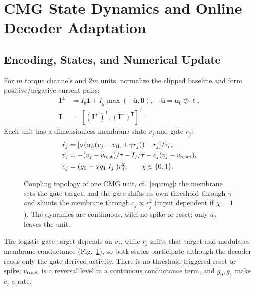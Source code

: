 \documentclass[letterpaper, 10 pt, conference]{ieeeconf}
\newcommand{\T}{^{\mathsf T}}
\begin{document}
\section{CMG State Dynamics and Online Decoder Adaptation}
\label{sec:architecture}
\label{sec:analysis}
\subsection{Encoding, States, and Numerical Update}

For $m$ torque channels and $2m$ units, normalize the clipped baseline and
form positive/negative current pairs:
\begin{equation}
 \begin{aligned}
 \bm I^{\pm}&=I_b\bm1+I_g\max(\pm\bar{\bm u},\bm0),\quad
 \bar{\bm u}=\bm u_0\oslash\bm\ell,\\
 \bm I&=[(\bm I^+)\T,(\bm I^-)\T]\T.
 \end{aligned}
 \label{eq:encoding}
\end{equation}
Each unit has a dimensionless membrane state $v_j$ and gate $r_j$:
\begin{align}
 \dot r_j&=[\sigma(\alpha_h(v_j-v_{\rm th}+\gamma r_j))-r_j]/\tau_r,\\
 \dot v_j&=-(v_j-v_{\rm rest})/\tau+I_j/\tau-c_j(v_j-v_{\rm reset}),\\
 c_j&=(g_0+\chi g_1|I_j|)r_j^2,\qquad \chi\in\{0,1\}.
 \label{eq:cmg}
\end{align}
\begin{figure}[t]
\centering
\resizebox{0.86\columnwidth}{!}{}
\caption{Coupling topology of one CMG unit, cf.~\eqref{eq:cmg}: the
membrane sets the gate target, and the gate shifts its own threshold
through $\gamma$ and shunts the membrane through $c_j\propto r_j^2$ (input
dependent if $\chi=1$). The dynamics are continuous, with no spike or
reset; only $a_j$ leaves the unit.}
\label{fig:cmgunit}
\end{figure}
%
The logistic gate target depends on $v_j$, while $r_j$ shifts that target
and modulates membrane conductance (Fig.~\ref{fig:cmgunit}), so both states
participate although the decoder reads only the gate-derived activity.
There is no threshold-triggered reset or spike; $v_{\rm reset}$ is a
reversal level in a continuous conductance term, and $g_0,g_1$ make $c_j$
a rate.
\end{document}
